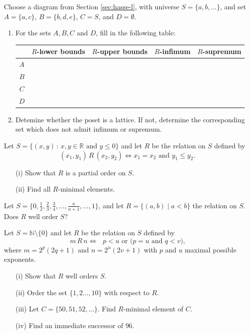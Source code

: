 \documentclass[11pt,paper=b5,footinclude,headinclude]{scrbook} %
\theoremstyle{remark}
\theoremstyle{definition} %
\theoremstyle{theorem} %
\newtheorem{ex}{Exercise\hypertarget{sol:\theex}}[chapter]
\begin{document}
\begin{ex}
    Choose a diagram from Section \ref{sec:hasse-l}, with universe $S=\{a,b,\dots\}$, and set $A=\{a,c\}$, $B=\{b,d,e\}$, $C=S$, and $D=\emptyset$. 
    \begin{enumerate}
        \item 
    For the sets $A,B,C$ and $D$, fill in the following table:

    \begin{tabular}{c|c|c|c|c}
         &$R$-lower bounds &$R$-upper bounds & $R$-infimum
         & $R$-supremum \\\hline
         $A$ &&&&\\
         $B$ &&&&\\
         $C$ &&&&\\
         $D$ &&&&
    \end{tabular}
\item Detemine whether the poset is a lattice. If not, determine the corresponding set which does not admit infimum or supremum.
    \end{enumerate}

\end{ex}


\begin{ex}
    Let $S=\{ (x,y) \,:\, x, y\in\mathbb{R} \textrm{ and } y\leq 0 \}$  and let $R$ be the relation on $S$ defined by 
$$(x_1,y_1)\, R\, (x_2,y_2) \Leftrightarrow  x_1 = x_2 \textrm{ and } y_1\leq y_2.$$
\begin{enumerate}
\item[(i)] Show that $R$ is a partial order on $S$.
\item[(ii)] Find all $R$-minimal elements.
\end{enumerate}
\end{ex}

\begin{ex}
     Let  $S= \{0,\frac{1}{2}, \frac{2}{3}, \frac{3}{4}, \ldots, \frac{n}{n+1}, \ldots, 1\}$, and let $R=\{(a,b)\mid a<b\}$ the relation on $S$. Does $R$ well order $S$?
\end{ex}
\begin{ex}
    Let $S = \mathbb{N}\setminus \{0\}$ and let  $R$ be the relation on $S$ defined by 
$$m\, R\, n \Leftrightarrow  \textrm{ $p< u$ or ($p=u$ and $q < v$),} $$
where $m=2^p(2q+1)$ and $n=2^u(2v+1)$ with $p$ and $u$ maximal possible exponents.
\begin{enumerate}
\item[(i)] Show that $R$ well orders $S$.
\item[(ii)] Order the set  $\{1,2\ldots, 10\}$ with respect to $R$.
\item[(iii)] Let $C= \{50, 51, 52, \ldots\}$. Find $R$-minimal element of $C$.
\item[(iv)] Find an immediate successor of $96$.
\end{enumerate}
\end{ex} 
\appendix
\end{document}
